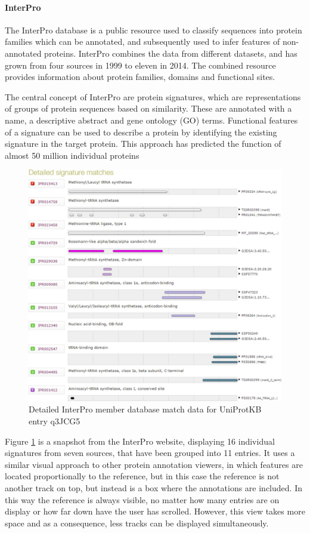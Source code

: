\paragraph{InterPro} 
The InterPro database is a public resource used to classify sequences into protein families which can be annotated, and subsequently used to infer features of non-annotated proteins. InterPro combines the data from different datasets, and has grown from four sources in 1999 to eleven in 2014. The combined resource provides information about protein families, domains and functional sites.

The central concept of InterPro are protein signatures, which are representations of groups of protein sequences based on similarity. These are annotated with a name, a descriptive abstract and gene ontology (GO) terms. Functional features of a signature can be used to describe a protein by identifying the existing signature in the target protein. This approach has predicted the function of almost 50 million individual proteins \cite{MIT2014}

\begin{figure}[ht]
\centering
\includegraphics[width=6in]{figures/interpro.jpg} 
\caption[Interprot Snapshot] {Detailed InterPro member database match data for UniProtKB entry q3JCG5} \label{fig: interior}
\end{figure}

Figure \ref{fig: interior} is a snapshot from the InterPro website, displaying 16 individual signatures from seven sources, that have been grouped into 11 entries.
It uses a similar visual approach to other protein annotation viewers, in which features are located proportionally to the reference, but in this case the reference is not another track on top, but instead is a box where the annotations are included. In this way the reference is always visible, no matter how many entries are on display or how far down have the user has scrolled. However, this view takes more space and as a consequence, less tracks can be displayed simultaneously. 

